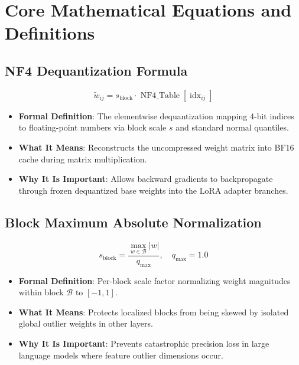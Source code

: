 \documentclass[11pt,a4paper]{article}
\theoremstyle{definition}
\begin{document}
\section{Core Mathematical Equations and Definitions}

\subsection{NF4 Dequantization Formula}
{\boldmath
\begin{equation}
\tilde{w}_{ij} = s_{\text{block}} \cdot \operatorname{NF4\_Table}[\operatorname{idx}_{ij}]
\end{equation}
}
\begin{itemize}
    \item \textbf{Formal Definition}: The elementwise dequantization mapping 4-bit indices to floating-point numbers via block scale $s$ and standard normal quantiles.
    \item \textbf{What It Means}: Reconstructs the uncompressed weight matrix into BF16 cache during matrix multiplication.
    \item \textbf{Why It Is Important}: Allows backward gradients to backpropagate through frozen dequantized base weights into the LoRA adapter branches.
\end{itemize}

\subsection{Block Maximum Absolute Normalization}
{\boldmath
\begin{equation}
s_{\text{block}} = \frac{\max_{w \in \mathcal{B}} |w|}{q_{\max}}, \quad q_{\max} = 1.0
\end{equation}
}
\begin{itemize}
    \item \textbf{Formal Definition}: Per-block scale factor normalizing weight magnitudes within block $\mathcal{B}$ to $[-1, 1]$.
    \item \textbf{What It Means}: Protects localized blocks from being skewed by isolated global outlier weights in other layers.
    \item \textbf{Why It Is Important}: Prevents catastrophic precision loss in large language models where feature outlier dimensions occur.
\end{itemize}
\end{document}
